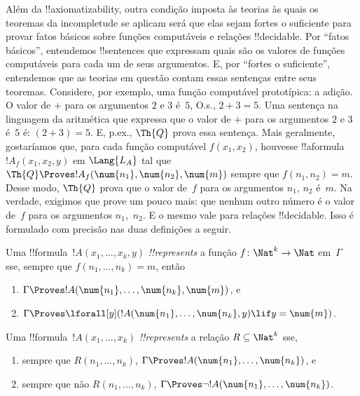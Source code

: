 \documentclass[../../../include/open-logic-section]{subfiles}
\begin{document}
Além da !!{axiomatizability}, outra condição imposta às teorias às quais
os teoremas da incompletude se aplicam será que elas sejam fortes o
suficiente para provar fatos básicos sobre funções computáveis e
relações !!{decidable}. Por ``fatos básicos'', entendemos !!{sentence}s
que expressam quais são os valores de funções computáveis para cada um
de seus argumentos. E, por ``fortes o suficiente'', entendemos que as
teorias em questão contam essas sentenças entre seus teoremas.
Considere, por exemplo, uma função computável prototípica: a adição. O
valor de $+$ para os argumentos $2$ e $3$ é~$5$, O.s.\@, $2+3 = 5$.
Uma sentença na linguagem da aritmética que expressa que o valor de $+$
para os argumentos $2$ e $3$ é~$5$ é:
$(\num{2} + \num{3}) = \num{5}$. E, p.ex., $\Th{Q}$ prova essa
sentença. Mais geralmente, gostaríamos que, para cada função computável
$f(x_1, x_2)$, houvesse !!a{formula}~$!A_f(x_1, x_2, y)$ em
$\Lang{L_A}$ tal que $\Th{Q} \Proves
!A_f(\num{n_1}, \num{n_2}, \num{m})$ sempre que $f(n_1, n_2) = m$.
Desse modo, $\Th{Q}$ prova que o valor de~$f$ para os argumentos $n_1$,
$n_2$ é~$m$. Na verdade, exigimos que prove um pouco mais: que nenhum
outro número é o valor de~$f$ para os argumentos $n_1$,~$n_2$. E o
mesmo vale para relações !!{decidable}. Isso é formulado com precisão
nas duas definições a seguir.

\begin{defn}
Uma !!{formula}~$!A(x_1, \dots, x_k, y)$ \emph{!!{represents}} a
função $f\colon \Nat^k \to \Nat$ em~$\Gamma$ sse, sempre que
$f(n_1, \dots, n_k) = m$, então
\begin{enumerate}
\item $\Gamma \Proves !A(\num{n_1}, \dots, \num{n_k}, \num{m})$, e
\item $\Gamma \Proves \lforall[y](!A(\num{n_1}, \dots, \num{n_k},
y) \lif y = \num{m})$.
\end{enumerate}
\end{defn}

\begin{defn}
Uma !!{formula}~$!A(x_1, \dots, x_k)$ \emph{!!{represents}} a relação
$R \subseteq \Nat^k$ sse,
\begin{enumerate}
\item sempre que $R(n_1, \dots, n_k)$, $\Gamma \Proves
!A(\num{n_1}, \dots, \num{n_k})$, e
\item sempre que não $R(n_1, \dots, n_k)$, $\Gamma \Proves \lnot
!A(\num{n_1}, \dots, \num{n_k})$.
\end{enumerate}
\end{defn}
\end{document}
